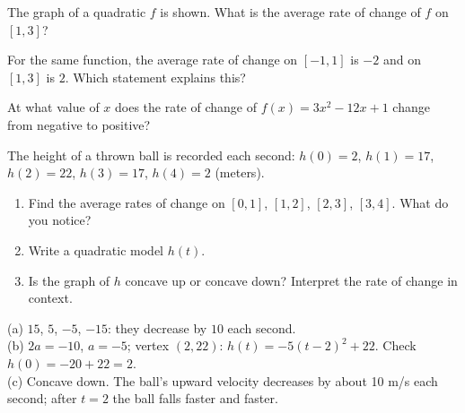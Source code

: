 \begin{exo}{}
The graph of a quadratic $f$ is shown. What is the average rate of change of $f$ on $[1,3]$?
\end{exo}
\begin{exo}{}
For the same function, the average rate of change on $[-1,1]$ is $-2$ and on $[1,3]$ is $2$. Which statement explains this?
\end{exo}
\begin{exo}{}
At what value of $x$ does the rate of change of $f(x)=3x^2-12x+1$ change from negative to positive?
\end{exo}
\begin{exo}{}
The height of a thrown ball is recorded each second: $h(0)=2$, $h(1)=17$, $h(2)=22$, $h(3)=17$, $h(4)=2$ (meters).
\begin{enumerate}[label=(\alph*)]
\item Find the average rates of change on $[0,1]$, $[1,2]$, $[2,3]$, $[3,4]$. What do you notice?
\item Write a quadratic model $h(t)$.
\item Is the graph of $h$ concave up or concave down? Interpret the rate of change in context.
\end{enumerate}
\begin{solution}
(a) $15$, $5$, $-5$, $-15$: they decrease by $10$ each second.\\
(b) $2a=-10$, $a=-5$; vertex $(2,22)$: $h(t)=-5(t-2)^2+22$. Check $h(0)=-20+22=2$.\\
(c) Concave down. The ball's upward velocity decreases by about 10 m/s each second; after $t=2$ the ball falls faster and faster.
\end{solution}
\end{exo}

